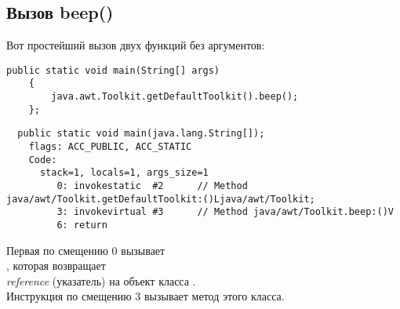 \subsection{Вызов beep()}

Вот простейший вызов двух функций без аргументов:

\begin{lstlisting}[style=customjava]
	public static void main(String[] args)
	{
		java.awt.Toolkit.getDefaultToolkit().beep();
	};
\end{lstlisting}

\begin{lstlisting}
  public static void main(java.lang.String[]);
    flags: ACC_PUBLIC, ACC_STATIC
    Code:
      stack=1, locals=1, args_size=1
         0: invokestatic  #2      // Method java/awt/Toolkit.getDefaultToolkit:()Ljava/awt/Toolkit;
         3: invokevirtual #3      // Method java/awt/Toolkit.beep:()V
         6: return        
\end{lstlisting}

Первая  по смещению 0 вызывает\\
, 
которая возвращает\\
\emph{reference} (указатель) на объект класса .\\

Инструкция  по смещению 3 вызывает метод  этого класса.
